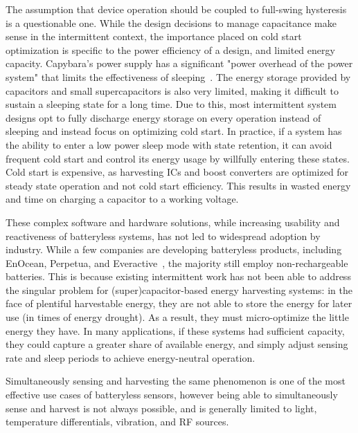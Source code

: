 The assumption that device operation should be coupled to full-swing hysteresis is a questionable one.
While the design decisions to manage capacitance make sense in the intermittent context, the importance placed on cold start optimization is specific to the power efficiency of a design, and limited energy capacity.
Capybara's power supply has a significant
"power overhead of the power system" that limits the effectiveness of
sleeping~\cite{colinReconfigurable18}. The energy storage provided by capacitors and small supercapacitors is also very limited, making it difficult to sustain a sleeping state for a long time.
Due to this, most intermittent system designs opt to fully discharge energy storage on every operation instead of sleeping and instead focus on optimizing cold start.
In practice, if a system has the ability to enter a low power sleep mode with state retention, it can avoid frequent cold start and control its energy usage by willfully entering these
states.
Cold start is expensive, as harvesting ICs and boost converters are optimized for steady state operation and not cold start efficiency. This results in wasted energy and time on charging a capacitor to a working voltage.

These complex software and hardware solutions, while increasing usability and reactiveness of batteryless systems, has not led to widespread adoption by industry.
While a few companies are developing batteryless products, including EnOcean, Perpetua, and Everactive~\cite{enocean, perpetua, everactive}, the majority still employ non-rechargeable batteries.
This is because existing intermittent work has not been able to address the singular problem for (super)capacitor-based energy
harvesting systems: in the face of plentiful harvestable energy, they are not
able to store the energy for later use (in times of energy drought).
As a result, they must
micro-optimize the little energy they have.
In many applications, if these
systems had sufficient capacity, they could capture a greater share of available energy, and simply adjust sensing rate and
sleep periods to achieve energy-neutral operation.

Simultaneously sensing and harvesting the same phenomenon is one of the most effective use cases of batteryless sensors, however being able to simultaneously sense and harvest is not always possible, and is generally limited to light, temperature differentials, vibration, and RF sources.

